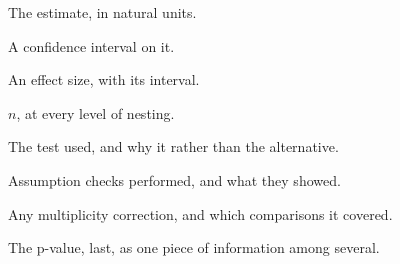 \begin{conceptbox}
\begin{tight}
  \item The estimate, in natural units.
  \item A confidence interval on it.
  \item An effect size, with its interval.
  \item $n$, at every level of nesting.
  \item The test used, and why it rather than the alternative.
  \item Assumption checks performed, and what they showed.
  \item Any multiplicity correction, and which comparisons it covered.
  \item The p-value, last, as one piece of information among several.
\end{tight}
\end{conceptbox}
